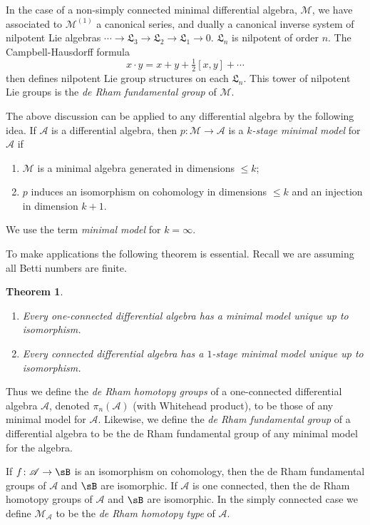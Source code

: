\documentclass[11pt]{amsart}
\theoremstyle{plain}
\newtheorem{theorem}{Theorem}[section]
\theoremstyle{definition}
\newcommand{\sA}{\mathscr{A}}
\newcommand{\cM}{\mathcal{M}}
\begin{document}
In the case of a non-simply connected minimal differential algebra, $\cM$, we have associated to $\cM^{(1)}$ a canonical series, and dually a canonical inverse system of nilpotent Lie algebras $\cdots \to \mathfrak{L}_{3} \to \mathfrak{L}_{2} \to \mathfrak{L}_{1} \to 0$. $\mathfrak{L}_{n}$ is nilpotent of order $n$. The Campbell-Hausdorff formula
\[
x \cdot y = x + y + \tfrac{1}{2}[x,y] + \cdots
\]
then defines nilpotent Lie group structures on each $\mathfrak{L}_{n}$. This tower of nilpotent Lie groups is the \emph{de Rham fundamental group} of $\cM$.

The above discussion can be applied to any differential algebra by the following idea. If $\sA$ is a differential algebra, then $p \colon \cM \to \sA$ is a \emph{$k$-stage minimal model} for $\sA$ if
\begin{enumerate}
\item $\cM$ is a minimal algebra generated in dimensions $\le k$;
\item $p$ induces an isomorphism on cohomology in dimensions $\le k$ and an injection in dimension $k+1$.
\end{enumerate}
We use the term \emph{minimal model} for $k = \infty$.

To make applications the following theorem is essential. Recall we are assuming all Betti numbers are finite.

\begin{theorem}\label{thm:1.1}
\begin{enumerate}
\item[(a)] Every one-connected differential algebra has a minimal model unique up to isomorphism.
\item[(b)] Every connected differential algebra has a $1$-stage minimal model unique up to isomorphism.
\end{enumerate}
\end{theorem}

Thus we define the \emph{de Rham homotopy groups} of a one-connected differential algebra $\sA$, denoted $\pi_{n}(\sA)$ (with Whitehead product), to be those of any minimal model for $\sA$. Likewise, we define the \emph{de Rham fundamental group} of a differential algebra to be the de Rham fundamental group of any minimal model for the algebra.

If $f \colon \sA \to \sB$ is an isomorphism on cohomology, then the de Rham fundamental groups of $\sA$ and $\sB$ are isomorphic. If $\sA$ is one connected, then the de Rham homotopy groups of $\sA$ and $\sB$ are isomorphic. In the simply connected case we define $\cM_{\sA}$ to be the \emph{de Rham homotopy type} of $\sA$.
\end{document}
